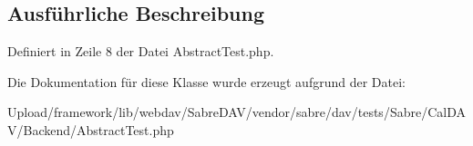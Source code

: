 \subsection{Ausführliche Beschreibung}


Definiert in Zeile 8 der Datei Abstract\+Test.\+php.



Die Dokumentation für diese Klasse wurde erzeugt aufgrund der Datei\+:\begin{DoxyCompactItemize}
\item 
Upload/framework/lib/webdav/\+Sabre\+D\+A\+V/vendor/sabre/dav/tests/\+Sabre/\+Cal\+D\+A\+V/\+Backend/Abstract\+Test.\+php\end{DoxyCompactItemize}

